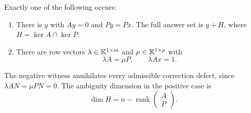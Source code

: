 \begin{proposition}\label{KS57}
Exactly one of the following occurs:
\begin{enumerate}
\item There is \(y\) with \(Ay=0\) and \(Py=Px\). The full answer set is \(y+H\), where \(H=\ker A\cap\ker P\).
\item There are row vectors \(\lambda\in\mathbb K^{1\times m}\) and \(\mu\in\mathbb K^{1\times p}\) with
\[
 \lambda A=\mu P,\qquad\lambda Ax=1.
\]
\end{enumerate}
The negative witness annihilates every admissible correction defect, since \(\lambda AN=\mu PN=0\). The ambiguity dimension in the positive case is
\[
 \dim H=n-\operatorname{rank}\begin{pmatrix}A\\P\end{pmatrix}.
\]
\end{proposition}
